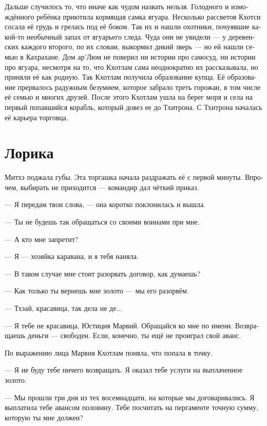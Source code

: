 \documentclass[a4paper,12pt,fleqn]{book}\usepackage{cooltooltips}\usepackage{polyglossia}\setdefaultlanguage[babelshorthands=true]{russian}\setotherlanguage{english}\defaultfontfeatures{Ligatures=TeX,Mapping=tex-text} \usepackage{xcolor}\definecolor{lightgray}{HTML}{bbbbbb}\color{lightgray}\newcommand{\ml}[3]{\textenglish{\textcolor{black}{#3}} }
\newcommand{\asterism}{\vspace{1em}{\centering\Large\bfseries$\ast~\ast~\ast$\par}\vspace{1em}}
\begin{document}
Дальше случилось то, что иначе как чудом назвать нельзя.
Голодного и измождённого ребёнка приютила кормящая самка ягуара.
Несколько рассветов Кхотси сосала её грудь и грелась под её боком.
Так их и нашли охотники, почуявшие какой-то необычный запах от ягуарьего следа.
Чуда они не увидели --- у деревенских каждого второго, по их словам, выкормил дикий зверь --- но ей нашли семью в Кахрахане.
Дом ар'Люм не поверил ни истории про самосуд, ни истории про ягуара, несмотря на то, что Кхотлам сама неоднократно их рассказывала, но приняли её как родную.
Так Кхотлам получила образование купца.
Её образование прервалось радужным безумием, которое забрало треть горожан, в том числе её семью и многих друзей.
После этого Кхотлам ушла на берег моря и села на первый попавшийся корабль, который довез ее до Тхитрона.
С Тхитрона началась её карьера торговца.

\chapter{Лорика}

Митхэ поджала губы.
Эта торгашка начала раздражать её с первой минуты.
Впрочем, выбирать не приходится --- командир дал чёткий приказ.

--- Я передам твои слова, --- она коротко поклонилась и вышла.

\asterism

--- Ты не будешь так обращаться со своими воинами при мне.

--- А кто мне запретит?

--- Я --- хозяйка каравана, и я тебя наняла.

--- В таком случае мне стоит разорвать договор, как думаешь?

--- Как только ты вернешь мне золото --- мы его разорвём.

--- Тхэай, красавица, так дела не де...

--- Я тебе не красавица, Юстиция Марвий.
Обращайся ко мне по имени.
Возвращаешь деньги --- свободен.
Если, конечно, ты ещё не проиграл свой аванс.

По выражению лица Марвия Кхотлам поняла, что попала в точку.

--- Я не буду тебе ничего возвращать.
Я оказал тебе услуги на выплаченное золото.

--- Мы прошли три дня из тех восемнадцати, на которые мы договаривались.
Я выплатила тебе авансом половину.
Тебе посчитать на пергаменте точную сумму, которую ты мне должен?
\end{document}
